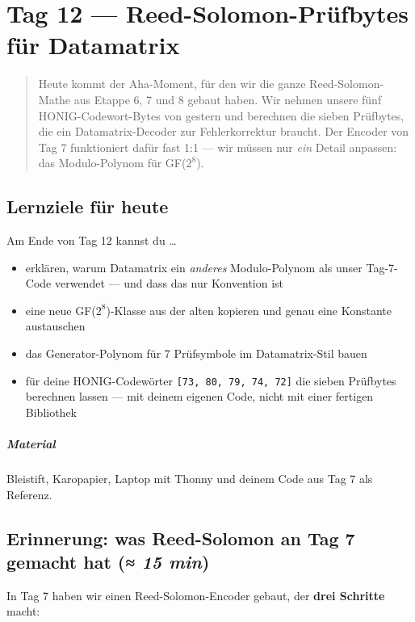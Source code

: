 \chapter{Tag 12 — Reed-Solomon-Prüfbytes für Datamatrix}

\begin{quote}
Heute kommt der Aha-Moment, für den wir die ganze Reed-Solomon-Mathe
aus Etappe 6, 7 und 8 gebaut haben. Wir nehmen unsere fünf
HONIG-Codewort-Bytes von gestern und berechnen die sieben
Prüfbytes, die ein Datamatrix-Decoder zur Fehlerkorrektur braucht.
Der Encoder von Tag 7 funktioniert dafür fast 1:1 — wir müssen nur
\emph{ein} Detail anpassen: das Modulo-Polynom für GF($2^8$).
\end{quote}

\section*{Lernziele für heute}

Am Ende von Tag 12 kannst du \dots

\begin{itemize}
\item erklären, warum Datamatrix ein \emph{anderes} Modulo-Polynom
  als unser Tag-7-Code verwendet — und dass das nur Konvention ist
\item eine neue GF($2^8$)-Klasse aus der alten kopieren und genau
  eine Konstante austauschen
\item das Generator-Polynom für 7 Prüfsymbole im Datamatrix-Stil
  bauen
\item für deine HONIG-Codewörter \texttt{[73, 80, 79, 74, 72]} die
  sieben Prüfbytes berechnen lassen — mit deinem eigenen Code, nicht
  mit einer fertigen Bibliothek
\end{itemize}

\paragraph{Material} Bleistift, Karopapier, Laptop mit Thonny und
deinem Code aus Tag 7 als Referenz.

\section{Erinnerung: was Reed-Solomon an Tag 7 gemacht hat \normalfont(\textit{≈ 15 min})}

In Tag 7 haben wir einen Reed-Solomon-Encoder gebaut, der
\textbf{drei Schritte} macht:

